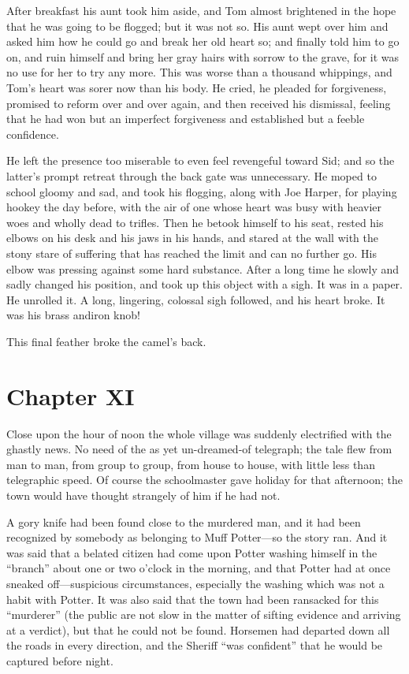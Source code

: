 \documentclass{book}
\begin{document}
After breakfast his aunt took him aside, and Tom almost brightened in the hope that he was going to be flogged; but it was not so. His aunt wept over him and asked him how he could go and break her old heart so; and finally told him to go on, and ruin himself and bring her gray hairs with sorrow to the grave, for it was no use for her to try any more. This was worse than a thousand whippings, and Tom’s heart was sorer now than his body. He cried, he pleaded for forgiveness, promised to reform over and over again, and then received his dismissal, feeling that he had won but an imperfect forgiveness and established but a feeble confidence.

He left the presence too miserable to even feel revengeful toward Sid; and so the latter’s prompt retreat through the back gate was unnecessary. He moped to school gloomy and sad, and took his flogging, along with Joe Harper, for playing hookey the day before, with the air of one whose heart was busy with heavier woes and wholly dead to trifles. Then he betook himself to his seat, rested his elbows on his desk and his jaws in his hands, and stared at the wall with the stony stare of suffering that has reached the limit and can no further go. His elbow was pressing against some hard substance. After a long time he slowly and sadly changed his position, and took up this object with a sigh. It was in a paper. He unrolled it. A long, lingering, colossal sigh followed, and his heart broke. It was his brass andiron knob!

This final feather broke the camel’s back.

\chapter*{Chapter XI}

Close upon the hour of noon the whole village was suddenly electrified with the ghastly news. No need of the as yet un-dreamed-of telegraph; the tale flew from man to man, from group to group, from house to house, with little less than telegraphic speed. Of course the schoolmaster gave holiday for that afternoon; the town would have thought strangely of him if he had not.

A gory knife had been found close to the murdered man, and it had been recognized by somebody as belonging to Muff Potter—so the story ran. And it was said that a belated citizen had come upon Potter washing himself in the “branch” about one or two o’clock in the morning, and that Potter had at once sneaked off—suspicious circumstances, especially the washing which was not a habit with Potter. It was also said that the town had been ransacked for this “murderer” (the public are not slow in the matter of sifting evidence and arriving at a verdict), but that he could not be found. Horsemen had departed down all the roads in every direction, and the Sheriff “was confident” that he would be captured before night.
\end{document}
